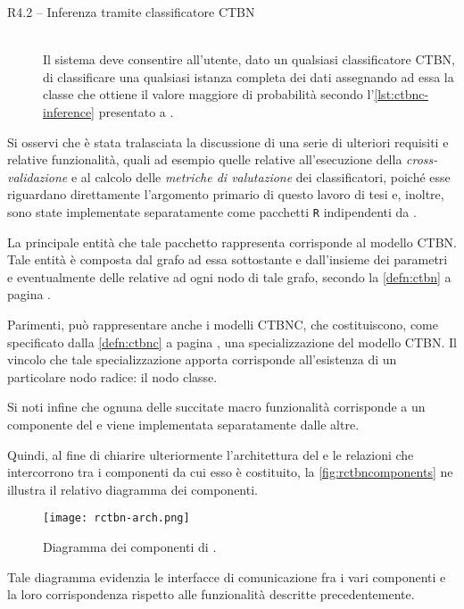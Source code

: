 \begin{description}
\begin{description}
		\item[R4.2 -- Inferenza tramite classificatore CTBN] \hfill \\
		Il sistema deve consentire all'utente, dato un qualsiasi classificatore \acs{CTBN}, di classificare una qualsiasi istanza completa dei dati assegnando ad essa la classe che ottiene il valore maggiore di probabilità secondo l'\autoref{lst:ctbnc-inference} presentato a .
		\end{description}
\end{description}
Si osservi che è stata tralasciata la discussione di una serie di ulteriori requisiti e relative funzionalità, quali ad esempio quelle relative all'esecuzione della \emph{cross-validazione} e al calcolo delle \emph{metriche di valutazione} dei classificatori, poiché esse riguardano direttamente l'argomento primario di questo lavoro di tesi e, inoltre, sono state implementate separatamente come pacchetti \lstinline$R$ indipendenti da \rctbn{}.

La principale entità che tale pacchetto rappresenta corrisponde al modello \acs{CTBN}. Tale entità è composta dal grafo ad essa sottostante e dall'insieme dei parametri e eventualmente delle \im{} relative ad ogni nodo di tale grafo, secondo la \autoref{defn:ctbn} a pagina \pageref{defn:ctbn}.

Parimenti, \rctbn{} può rappresentare anche i modelli \acs{CTBNC}, che costituiscono, come specificato dalla \autoref{defn:ctbnc} a pagina \pageref{defn:ctbnc}, una specializzazione del modello \acs{CTBN}. Il vincolo che tale specializzazione apporta corrisponde all'esistenza di un particolare nodo radice: il nodo classe.

Si noti infine che ognuna delle succitate macro funzionalità corrisponde a un componente del \pacchettor{} e viene implementata separatamente dalle altre.

Quindi, al fine di chiarire ulteriormente l'architettura del \pacchettor{} e le relazioni che intercorrono tra i componenti da cui esso è costituito, la \vref{fig:rctbncomponents} ne illustra il relativo diagramma dei componenti.
\begin{figure}[ht]
	\centering
	\texttt{[image: rctbn-arch.png]}
	\caption[Diagramma dei componenti di \rctbn{}]{Diagramma dei componenti di \rctbn{}.}
	\label{fig:rctbncomponents}
\end{figure}
Tale diagramma evidenzia le interfacce di comunicazione fra i vari componenti e la loro corrispondenza rispetto alle funzionalità descritte precedentemente.
